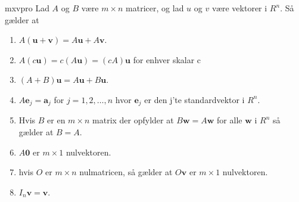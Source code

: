 \begin{thm}{}{mxvpro}
Lad $A$ og $B$ være $m \times n$ matricer, og lad $u$ og $v$ være vektorer i $R^n$. Så gælder at
\begin{enumerate}
\item $A(\mathbf{u}+\mathbf{v})=A\mathbf{u}+A\mathbf{v}$.
\item $A(c\mathbf{u})=c(A\mathbf{u})=(cA)\mathbf{u}$ for enhver skalar c
\item $(A+B)\mathbf{u}=A\mathbf{u}+B\mathbf{u}$.
\item $A\mathbf{e}_j=\mathbf{a}_j$ for $j=1,2,\ldots,n$ hvor $\mathbf{e}_j$ er den j'te standardvektor i $R^n$.
\item Hvis $B$ er en $m \times n$ matrix der opfylder at $B\mathbf{w}=A\mathbf{w}$ for alle $\mathbf{w}$ i $R^n$ så gælder at $B=A$.
\item $A\mathbf{0}$ er $m \times 1$ nulvektoren.
\item hvis $O$ er $m \times n$ nulmatricen, så gælder at $O\mathbf{v}$ er $m \times 1$ nulvektoren.
\item $I_n\mathbf{v}=\mathbf{v}$.
\end{enumerate}
\end{thm}
